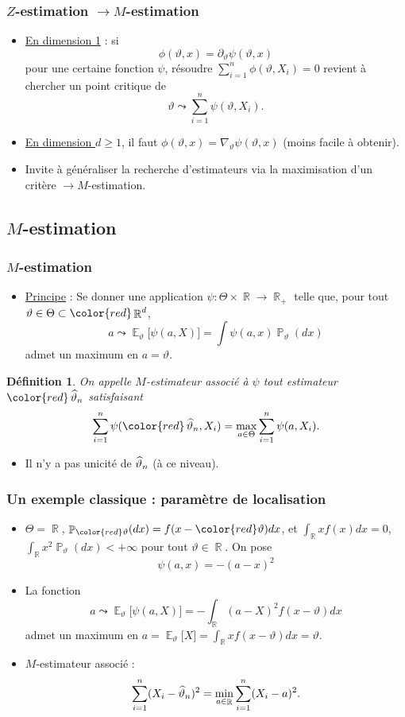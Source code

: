 ﻿\documentclass{beamer}
\newtheorem{df}{Définition}
\DeclareMathOperator{\E}{{\mathbb E}}
\DeclareMathOperator{\R}{{\mathbb R}}
\DeclareMathOperator{\PP}{{\mathbb P}}
\DeclareMathOperator{\est}{\widehat \vartheta_{\mathnormal{n}}}
\begin{document}
\begin{frame}
\frametitle{$Z$-estimation $\rightarrow M$-estimation}
\begin{itemize}
\item \underline{En dimension 1} : si
$$\boxed{\phi(\vartheta,x) = \partial_\vartheta\psi(\vartheta, x)}$$
pour une certaine fonction $\psi$, résoudre
$\sum_{i = 1}^n \phi(\vartheta, X_i)=0$
revient à {\color{red}chercher un point critique} de
$$\vartheta \leadsto \sum_{i = 1}^n\psi(\vartheta, X_i).$$
\item \underline{En dimension $d \geq 1$}, il faut $\phi(\vartheta, x) = \nabla_\vartheta \psi(\vartheta, x)$ (moins facile à obtenir).
\item {\color{red} Invite à généraliser} la recherche d'estimateurs via la maximisation d'un critère $\rightarrow M$-estimation.
\end{itemize}
\end{frame}

\subsection{$M$-estimation}

\begin{frame}
\frametitle{$M$-estimation}
\begin{itemize}
\item \underline{Principe} : Se donner une application $\psi : \Theta \times \R \rightarrow \R_+$ telle que, pour tout $\vartheta \in \Theta \subset {\color{red}\R^d}$,
$$a \leadsto \E_\vartheta\big[\psi(a,X)\big] = \int \psi(a,x)\PP_\vartheta(dx)$$
admet {\color{red}un maximum en $a=\vartheta$}.
\end{itemize}
\begin{df}
On appelle $M$-estimateur associé à $\psi$ tout estimateur ${\color{red}\est}$ satisfaisant
$$\sum_{i = 1}^n \psi({\color{red}\est}, X_i) = \max_{a \in \Theta}\sum_{i = 1}^n\psi(a, X_i).$$
\end{df}
\begin{itemize}
\item Il n'y a pas unicité de $\est$ (à ce niveau).
\end{itemize}
\end{frame}

\begin{frame}
\frametitle{Un exemple classique : paramètre de localisation}
\begin{itemize}
\item $\Theta = \R$, $\PP_{\color{red}\vartheta}(dx) = f(x-{\color{red}\vartheta})dx$, et $\int_{\R}xf(x)dx=0$, $\int_{\R}x^2\PP_\vartheta(dx)<+\infty$ pour tout $\vartheta \in \R$. On pose
$$\boxed{\psi(a,x)=-(a-x)^2}$$
\item La fonction
$$a \leadsto \E_\vartheta\big[\psi(a,X)\big] =
-\int_{\R}(a-X)^2f(x-\vartheta)dx$$
admet un {\color{red}maximum} en $a=\E_\vartheta\big[X\big] = \int_{\R}xf(x-\vartheta)dx=\vartheta.$
\item {\color{red}$M$-estimateur associé :}
$$\sum_{i = 1}^n(X_i-\est)^2 = \min_{a \in \R}\sum_{i = 1}^n (X_i-a)^2.$$
\end{itemize}
\end{frame}
\end{document}
